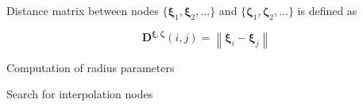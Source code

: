 \documentclass[11pt, a4paper]{article}
\begin{document}
Distance matrix between nodes $\{\boldsymbol{\xi}_1, \boldsymbol{\xi}_2, \dots\}$
and $\{\boldsymbol{\zeta}_1, \boldsymbol{\zeta}_2, \dots\}$ is defined as

\begin{equation}
    \mathbf{D}^{\boldsymbol{\xi}, \boldsymbol{\zeta}}(i, j) =
        \left\| \boldsymbol{\xi}_i - \boldsymbol{\xi}_j \right\|
    \label{equ:distance-matrix}
\end{equation}

\begin{algorithm}
    \caption{Computation of radius parameters}
    
    \label{alg:radiusparameters}
\end{algorithm}

\begin{algorithm}
    \caption{Search for interpolation nodes}
    
    \label{alg:nodesearch}
\end{algorithm}
\end{document}

